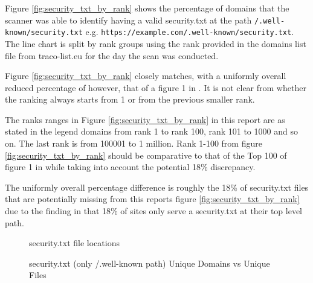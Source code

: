 \documentclass{mscreport}
\begin{document}
\clearpage
\newpage

\noindent
Figure \ref{fig:security_txt_by_rank} shows the percentage of domains that the scanner was able to identify having a valid security.txt at the path \texttt{/.well-known/security.txt} e.g. \newline \texttt{https://example.com/.well-known/security.txt}. The line chart is split by rank groups using the rank provided in the domains list file from traco-list.eu for the day the scan was conducted.

\vspace{0.3cm} \noindent
Figure \ref{fig:security_txt_by_rank} closely matches, with a uniformly overall reduced percentage of however, that of a figure 1 in \cite{Poteat2021-zr}. It is not clear from \cite{Poteat2021-zr} whether the ranking always starts from 1 or from the previous smaller rank.

\vspace{0.3cm} \noindent
The ranks ranges in Figure \ref{fig:security_txt_by_rank} in this report are as stated in the legend domains from rank 1 to rank 100, rank 101 to 1000 and so on. The last rank is from 100001 to 1 million. Rank 1-100 from figure \ref{fig:security_txt_by_rank} should be comparative to that of the Top 100 of figure 1 in \cite{Poteat2021-zr} while taking into account the potential 18\% discrepancy.

\vspace{0.3cm} \noindent
The uniformly overall percentage difference is roughly the 18\% of security.txt files that are potentially missing from this reports figure \ref{fig:security_txt_by_rank} due to the finding in \cite{Poteat2021-zr} that 18\% of sites only serve a security.txt at their top level path.

\begin{figure}[H]
	\begin{center}
		\caption{security.txt file locations}
		\label{fig:security_txt_by_root_vs_non_root}
	\end{center}
\end{figure}

\clearpage
\newpage

\begin{figure}[t]
	\begin{center}
		\caption{security.txt (only /.well-known path) Unique Domains vs Unique Files}
		\label{fig:security_txt_unique_vs_domains}
	\end{center}
\end{figure}
\end{document}
